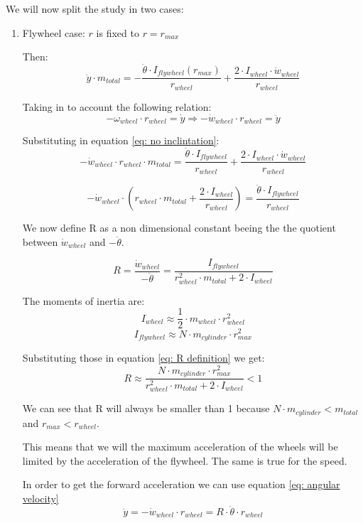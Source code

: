 We will now split the study in two cases:
\begin{enumerate}
    \item Flywheel case: $r$ is fixed to $r = r_{max}$ 
    
    Then:  
    \[\ddot{y}\cdot m_{total} = - \frac{\ddot{\theta}\cdot I_{flywheel}(r_{max})}
    {r_{wheel}} + \frac{2\cdot I_{wheel} \cdot  \dot{w}_{wheel}}{r_{wheel}}\]

    Taking in to account the following relation:
    \begin{equation} \label{eq: angular velocity}
        -\omega_{wheel} \cdot  r_{wheel} = \dot{y} \Rightarrow  -\dot{w}_{wheel} \cdot  r_{wheel} = \ddot{y}  
    \end{equation}

    Substituting in equation \ref{eq: no inclintation}:
    \[-\dot{w}_{wheel} \cdot  r_{wheel}\cdot m_{total} = \frac{\ddot{\theta}\cdot I_{flywheel}}
    {r_{wheel}} + \frac{2\cdot I_{wheel} \cdot  \dot{w}_{wheel}}{r_{wheel}} \]

    \[-\dot{w}_{wheel} \cdot (r_{wheel}\cdot m_{total} +  \frac{2\cdot I_{wheel} }{r_{wheel}}) = 
    \frac{\ddot{\theta}\cdot I_{flywheel}}{r_{wheel}}\]


    We now define R as a non dimensional constant beeing the the quotient between $\dot{w}_{wheel}$ and $-\ddot{\theta}$.

    \begin{equation}\label{eq: R definition}
        R = \frac{\dot{w}_{wheel}}{-\ddot{\theta}} = 
    \frac{I_{flywheel}}
    {r_{wheel}^2\cdot m_{total} +  2\cdot I_{wheel}}
    \end{equation}

    The moments of inertia are:
    \[I_{wheel} \approx \frac{1}{2} \cdot m_{wheel} \cdot  r_{wheel}^2\]
    \[I_{flywheel} \approx N \cdot  m_{cylinder} \cdot  r_{max}^2\]

    Substituting those in equation \ref{eq: R definition} we get:
    \[R \approx
    \frac{ N \cdot  m_{cylinder} \cdot  r_{max}^2}
    {r_{wheel}^2\cdot m_{total} +  2\cdot I_{wheel}} < 1 \] 

    We can see that R will always be smaller than 1 because $N \cdot  m_{cylinder} < m_{total} $ and $r_{max} < r_{wheel}$.
    
    This means that we will the maximum acceleration of the wheels will be limited by the acceleration of the flywheel. The same is true for the speed.

    In  order to get the forward acceleration we can use equation \ref{eq: angular velocity}
    \[\ddot{y} = -\dot{w}_{wheel} \cdot  r_{wheel} = R \cdot  \ddot{\theta} \cdot  r_{wheel}\]


\end{enumerate}
